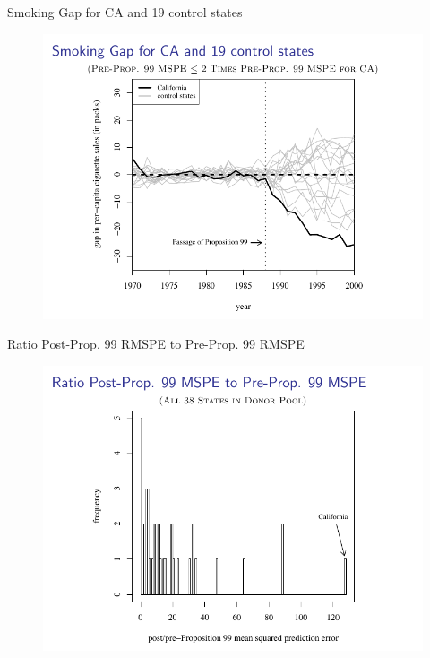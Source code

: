 \documentclass{beamer}
\begin{document}
\begin{frame}{Smoking Gap for CA and 19 control states}
	
	\begin{figure}
	\includegraphics[scale=0.75]{./lecture_includes/abadie_10.pdf}
	\end{figure}
\end{frame}

\begin{frame}{Ratio Post-Prop. 99 RMSPE to Pre-Prop. 99 RMSPE}

	\begin{figure}
	\includegraphics[scale=0.75]{./lecture_includes/abadie_11.pdf}
	\end{figure}
\end{frame}
\end{document}
